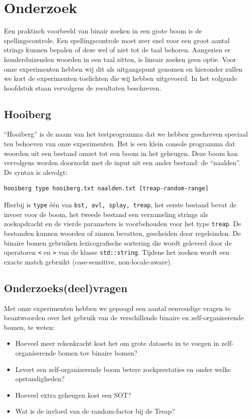 \documentclass[a4paper,10pt]{article}
\begin{document}
\section{Onderzoek}

Een praktisch voorbeeld van binair zoeken in een grote boom is de spellingscontrole. Een spellingscontrole moet zeer snel voor een groot aantal strings kunnen bepalen of deze wel of niet tot de taal behoren. Aangezien er honderduizenden woorden in een taal zitten, is
lineair zoeken geen optie. Voor onze experimenten hebben wij dit als uitgangspunt genomen en hieronder zullen we kort de experimenten toelichten die wij hebben uitgevoerd. In het volgende hoofdstuk staan vervolgens de resultaten beschreven.

\subsection{Hooiberg}

``Hooiberg'' is de naam van het testprogramma dat we hebben geschreven speciaal ten behoeven van onze experimenten.
Het is een klein console programma dat woorden uit een bestand omzet tot een boom in het geheugen. 
Deze boom kan vervolgens worden doorzocht met de input uit een ander bestand: de ``naalden''.
De syntax is alsvolgt:
\begin{verbatim}
hooiberg type hooiberg.txt naalden.txt [treap-random-range]
\end{verbatim}
Hierbij is \texttt{type} \'e\'en van \texttt{bst, avl, splay, treap}, het eerste bestand bevat de invoer voor de boom, het tweede bestand een verzameling strings als zoekopdracht en de vierde parameters is voorbehouden voor het type \texttt{treap}.
De bestanden kunnen woorden of zinnen bevatten, gescheiden door regeleinden. De binaire bomen gebruiken lexicografische sortering 
die wordt geleverd door de operatoren \texttt{<} en \texttt{>} van de klasse \texttt{std::string}. Tijdens het zoeken wordt een
exacte match gebruikt (case-sensitive, non-locale-aware).

\subsection{Onderzoeks(deel)vragen}

Met onze experimenten hebben we gepoogd een aantal eenvoudige vragen te beantwoorden over het gebruik van de verschillende
binaire en zelf-organiserende bomen, te weten:

\begin{itemize}
\item Hoeveel meer rekenkracht kost het om grote datasets in te voegen in zelf-organiserende bomen tov binaire bomen?
\item Levert een zelf-organiserende boom betere zoekprestaties en onder welke opstandigheden?
\item Hoeveel extra geheugen kost een SOT?
\item Wat is de invloed van de random-factor bij de Treap?
\end{itemize}
\end{document}
